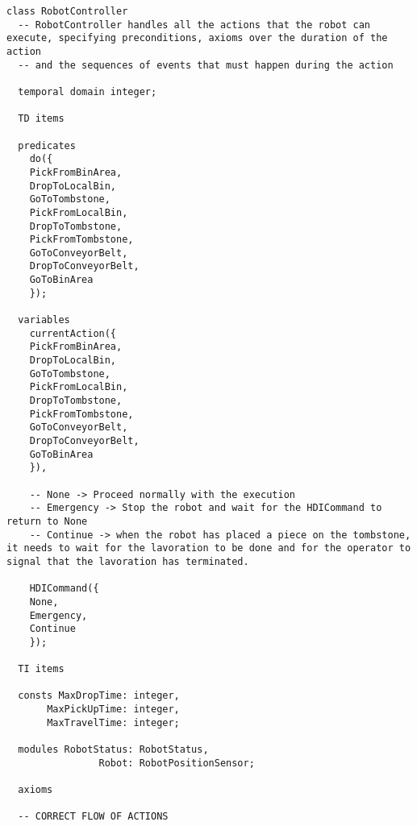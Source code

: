 \begin{lstlisting}[fontadjust, mathescape, frame=single] 
class RobotController
  -- RobotController handles all the actions that the robot can execute, specifying preconditions, axioms over the duration of the action
  -- and the sequences of events that must happen during the action

  temporal domain integer;

  TD items

  predicates
    do({
    PickFromBinArea,
    DropToLocalBin,
    GoToTombstone,
    PickFromLocalBin,
    DropToTombstone,
    PickFromTombstone,
    GoToConveyorBelt,
    DropToConveyorBelt,
    GoToBinArea
    });

  variables
    currentAction({
    PickFromBinArea,
    DropToLocalBin,
    GoToTombstone,
    PickFromLocalBin,
    DropToTombstone,
    PickFromTombstone,
    GoToConveyorBelt,
    DropToConveyorBelt,
    GoToBinArea
    }),

    -- None -> Proceed normally with the execution
    -- Emergency -> Stop the robot and wait for the HDICommand to return to None
    -- Continue -> when the robot has placed a piece on the tombstone, it needs to wait for the lavoration to be done and for the operator to signal that the lavoration has terminated.

    HDICommand({
    None,
    Emergency,
    Continue
    });
    
  TI items 
  
  consts MaxDropTime: integer,
       MaxPickUpTime: integer,
       MaxTravelTime: integer;

  modules RobotStatus: RobotStatus,
                Robot: RobotPositionSensor;

  axioms

  -- CORRECT FLOW OF ACTIONS


\end{lstlisting}
